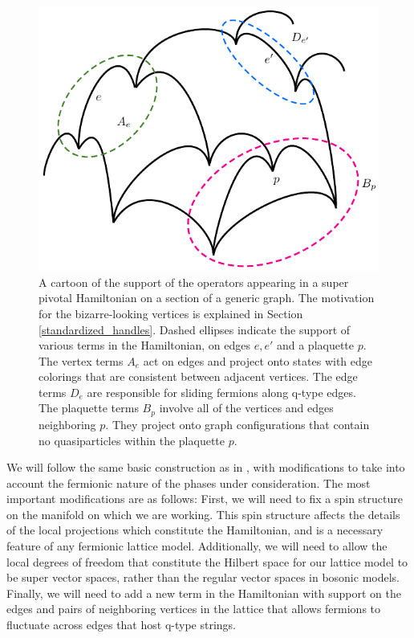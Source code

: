 \documentclass[12pt,a4paper]{article}
\begin{document}
 \begin{figure}
\begin{center}
  \includegraphics{sample_lattice.pdf}
 \caption{A cartoon of the support of the operators appearing in a super pivotal Hamiltonian on a section of a generic graph. 
The motivation for the bizarre-looking vertices is explained in Section \ref{standardized_handles}.
Dashed ellipses indicate the support of various terms in the Hamiltonian, on edges $e,e'$ and a plaquette $p$.
The vertex terms $A_e$ act on edges and project onto states with edge colorings that are consistent between adjacent vertices. 
The edge terms $D_e$ are responsible for sliding fermions along q-type edges. 
The plaquette terms $B_p$ involve all of the vertices and edges neighboring $p$.
They project onto graph configurations that contain no quasiparticles within the plaquette $p$.}
 \label{example_lattice}
 \end{center}
 \end{figure}

We will follow the same basic construction as in \cite{levin2005}, with modifications to take into account 
the fermionic nature of the phases under consideration. 
The most important modifications are as follows:
First, we will need to fix a spin structure on the manifold on which we are working.
This spin structure affects the details of the local projections which constitute the Hamiltonian, and is a necessary feature of any fermionic lattice model.
Additionally, we will need to allow the local degrees of freedom that constitute the 
Hilbert space for our lattice model to be super vector spaces, rather than the regular vector spaces in bosonic models. 
Finally, we will need to add a new term in the Hamiltonian with support on the edges and pairs of neighboring vertices in the lattice that allows fermions to fluctuate across edges 
that host q-type strings.%
\end{document}
